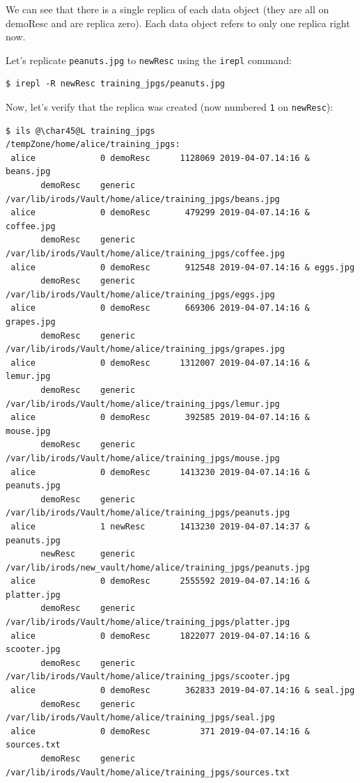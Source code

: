 \documentclass[10pt,oneside]{memoir}
\begin{document}
We can see that there is a single replica of each data object (they are all on demoResc and are replica zero). Each data object refers to only one replica right now.

Let's replicate \texttt{peanuts.jpg} to \texttt{newResc} using the \texttt{irepl} command:

\begin{lstlisting}
$ irepl -R newResc training_jpgs/peanuts.jpg
\end{lstlisting}

Now, let's verify that the replica was created (now numbered \texttt{1} on \texttt{newResc}):

\begin{lstlisting}[basicstyle=\tiny\rmfamily]
$ ils @\char45@L training_jpgs
/tempZone/home/alice/training_jpgs:
 alice             0 demoResc      1128069 2019-04-07.14:16 & beans.jpg
       demoResc    generic    /var/lib/irods/Vault/home/alice/training_jpgs/beans.jpg
 alice             0 demoResc       479299 2019-04-07.14:16 & coffee.jpg
       demoResc    generic    /var/lib/irods/Vault/home/alice/training_jpgs/coffee.jpg
 alice             0 demoResc       912548 2019-04-07.14:16 & eggs.jpg
       demoResc    generic    /var/lib/irods/Vault/home/alice/training_jpgs/eggs.jpg
 alice             0 demoResc       669306 2019-04-07.14:16 & grapes.jpg
       demoResc    generic    /var/lib/irods/Vault/home/alice/training_jpgs/grapes.jpg
 alice             0 demoResc      1312007 2019-04-07.14:16 & lemur.jpg
       demoResc    generic    /var/lib/irods/Vault/home/alice/training_jpgs/lemur.jpg
 alice             0 demoResc       392585 2019-04-07.14:16 & mouse.jpg
       demoResc    generic    /var/lib/irods/Vault/home/alice/training_jpgs/mouse.jpg
 alice             0 demoResc      1413230 2019-04-07.14:16 & peanuts.jpg
       demoResc    generic    /var/lib/irods/Vault/home/alice/training_jpgs/peanuts.jpg
 alice             1 newResc       1413230 2019-04-07.14:37 & peanuts.jpg
       newResc     generic    /var/lib/irods/new_vault/home/alice/training_jpgs/peanuts.jpg
 alice             0 demoResc      2555592 2019-04-07.14:16 & platter.jpg
       demoResc    generic    /var/lib/irods/Vault/home/alice/training_jpgs/platter.jpg
 alice             0 demoResc      1822077 2019-04-07.14:16 & scooter.jpg
       demoResc    generic    /var/lib/irods/Vault/home/alice/training_jpgs/scooter.jpg
 alice             0 demoResc       362833 2019-04-07.14:16 & seal.jpg
       demoResc    generic    /var/lib/irods/Vault/home/alice/training_jpgs/seal.jpg
 alice             0 demoResc          371 2019-04-07.14:16 & sources.txt
       demoResc    generic    /var/lib/irods/Vault/home/alice/training_jpgs/sources.txt
\end{lstlisting}
\end{document}

